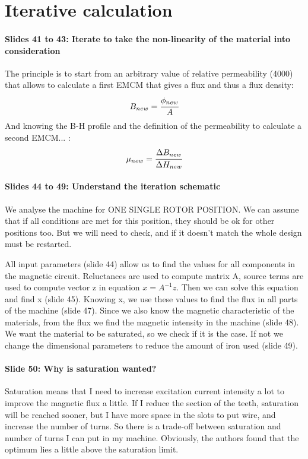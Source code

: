\section{Iterative calculation}

\paragraph{Slides 41 to 43: Iterate to take the non-linearity of the material into consideration}
The principle is to start from an arbitrary value of relative permeability (4000) that allows to calculate a first EMCM that gives a flux and thus a flux density:
$$B_{new} = \cfrac{\phi_{new}}{A}$$
And knowing the B-H profile and the definition of the permeability to calculate a second EMCM... :
$$\mu_{new}=\cfrac{\Delta B_{new}}{\Delta H_{new}}$$

\paragraph{Slides 44 to 49: Understand the iteration schematic}
We analyse the machine for ONE SINGLE ROTOR POSITION.
We can assume that if all conditions are met for this position, they should be ok for other positions too.
But we will need to check, and if it doesn't match the whole design must be restarted.

All input parameters (slide 44) allow us to find the values for all components in the magnetic circuit.
Reluctances are used to compute matrix A, source terms are used to compute vector z in equation $x= A^{-1} z$.
Then we can solve this equation and find x (slide 45).
Knowing x, we use these values to find the flux in all parts of the machine (slide 47).
Since we also know the magnetic characteristic of the materials, from the flux we find the magnetic intensity in the machine (slide 48).
We want the material to be saturated, so we check if it is the case. If not we change the dimensional parameters to reduce the amount of iron used (slide 49).

\paragraph{Slide 50: Why is saturation wanted?}
Saturation means that I need to increase excitation current intensity a lot to improve the magnetic flux a little.
If I reduce the section of the teeth, saturation will be reached sooner, but I have more space in the slots to put wire, and increase the number of turns.
So there is a trade-off between saturation and number of turns I can put in my machine.
Obviously, the authors found that the optimum lies a little above the saturation limit.


